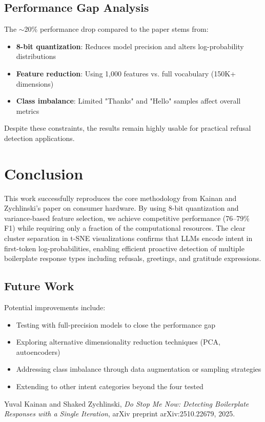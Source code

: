\documentclass[11pt]{article}
\begin{document}
\subsection{Performance Gap Analysis}

The $\sim$20\% performance drop compared to the paper stems from:
\begin{itemize}
    \item \textbf{8-bit quantization}: Reduces model precision and alters log-probability distributions
    \item \textbf{Feature reduction}: Using 1,000 features vs. full vocabulary (150K+ dimensions)
    \item \textbf{Class imbalance}: Limited "Thanks" and "Hello" samples affect overall metrics
\end{itemize}

Despite these constraints, the results remain highly usable for practical refusal detection applications.

\section{Conclusion}

This work successfully reproduces the core methodology from Kainan and Zychlinski's paper on consumer hardware. By using 8-bit quantization and variance-based feature selection, we achieve competitive performance (76--79\% F1) while requiring only a fraction of the computational resources. The clear cluster separation in t-SNE visualizations confirms that LLMs encode intent in first-token log-probabilities, enabling efficient proactive detection of multiple boilerplate response types including refusals, greetings, and gratitude expressions.

\subsection{Future Work}

Potential improvements include:
\begin{itemize}
    \item Testing with full-precision models to close the performance gap
    \item Exploring alternative dimensionality reduction techniques (PCA, autoencoders)
    \item Addressing class imbalance through data augmentation or sampling strategies
    \item Extending to other intent categories beyond the four tested
\end{itemize}

\begin{thebibliography}{9}
Yuval Kainan and Shaked Zychlinski,
\textit{Do Stop Me Now: Detecting Boilerplate Responses with a Single Iteration},
arXiv preprint arXiv:2510.22679, 2025.
\end{thebibliography}
\end{document}
